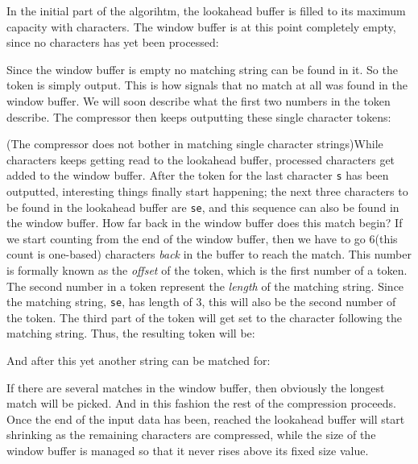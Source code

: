 In the initial part of the algorihtm, the lookahead buffer is filled
to its maximum capacity with characters. The window buffer is at this
point completely empty, since no characters has yet been processed:

\newcommand{\windowsize}{20}
\newcommand{\lookaheadsize}{10}


Since the window buffer is empty no matching string can be found in
it. So the token  is simply output. This is how \lzone
signals that no match at all was found in the window buffer. We will
soon describe what the first two numbers in the token describe. The
compressor then keeps outputting these single character tokens:


(The \lzone compressor does not bother in matching single character
strings)While characters keeps getting read to the lookahead buffer,
processed characters get added to the window buffer. After the token
for the last character \texttt{s} has been outputted, interesting
things finally start happening; the next three characters to be found
in the lookahead buffer are \texttt{{\spc{}se}}, and this sequence can
also be found in the window buffer. How far back in the window buffer
does this match begin? If we start counting from the end of the window
buffer, then we have to go $6$(this count is one-based) characters
\textit{back} in the buffer to reach the match. This number is formally known
as the \textit{offset} of the token, which is the first number of a
token. The second number in a token represent the \textit{length} of
the matching string. Since the matching string, \texttt{{\spc{}se}},
has length of $3$, this will also be the second number of the
token. The third part of the token will get set to the character
following the matching string. Thus, the resulting token will be:


And after this yet another string can be matched for:


If there are several matches in the window buffer, then obviously the
longest match will be picked. And in this fashion the rest of the
compression proceeds. Once the end of the input data has been, reached
the lookahead buffer will start shrinking as the remaining characters
are compressed, while the size of the window buffer is managed so that
it never rises above its fixed size value.

